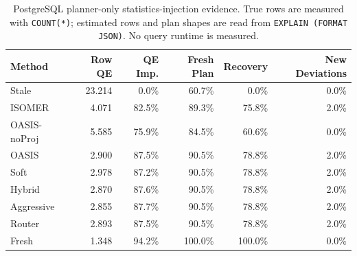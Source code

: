 \begin{table}[t]
  \centering
  \small
  \caption{PostgreSQL planner-only statistics-injection evidence. True rows are measured with \texttt{COUNT(*)}; estimated rows and plan shapes are read from \texttt{EXPLAIN (FORMAT JSON)}. No query runtime is measured.}
  \label{tab:postgres_planner_stats_injection}
  \setlength{\tabcolsep}{4pt}
  \begin{tabular}{lrrrrr}
    \toprule
    Method & Row QE & QE Imp. & Fresh Plan & Recovery & New Deviations \\
    \midrule
    Stale & 23.214 & 0.0\% & 60.7\% & 0.0\% & 0.0\% \\
    ISOMER & 4.071 & 82.5\% & 89.3\% & 75.8\% & 2.0\% \\
    OASIS-noProj & 5.585 & 75.9\% & 84.5\% & 60.6\% & 0.0\% \\
    OASIS & 2.900 & 87.5\% & 90.5\% & 78.8\% & 2.0\% \\
    Soft & 2.978 & 87.2\% & 90.5\% & 78.8\% & 2.0\% \\
    Hybrid & 2.870 & 87.6\% & 90.5\% & 78.8\% & 2.0\% \\
    Aggressive & 2.855 & 87.7\% & 90.5\% & 78.8\% & 2.0\% \\
    Router & 2.893 & 87.5\% & 90.5\% & 78.8\% & 2.0\% \\
    Fresh & 1.348 & 94.2\% & 100.0\% & 100.0\% & 0.0\% \\
    \bottomrule
  \end{tabular}
\end{table}
